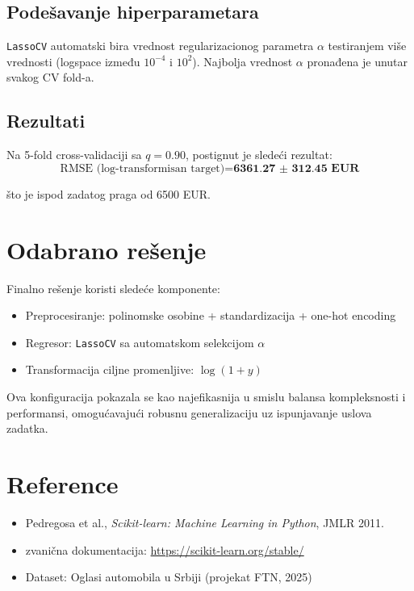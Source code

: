 \documentclass[a4paper,12pt]{article}
\begin{document}
\subsection{Podešavanje hiperparametara}

\texttt{LassoCV} automatski bira vrednost regularizacionog parametra $\alpha$ testiranjem više vrednosti (logspace između $10^{-4}$ i $10^2$). Najbolja vrednost $\alpha$ pronađena je unutar svakog CV fold-a.

\subsection{Rezultati}

Na 5-fold cross-validaciji sa $q=0.90$, postignut je sledeći rezultat:
\[
\text{RMSE (log-transformisan target)} = \textbf{6361.27 ± 312.45 EUR}
\]

što je ispod zadatog praga od 6500 EUR.

\section{Odabrano rešenje}

Finalno rešenje koristi sledeće komponente:
\begin{itemize}
    \item Preprocesiranje: polinomske osobine + standardizacija + one-hot encoding
    \item Regresor: \texttt{LassoCV} sa automatskom selekcijom $\alpha$
    \item Transformacija ciljne promenljive: $\log(1 + y)$
\end{itemize}

Ova konfiguracija pokazala se kao najefikasnija u smislu balansa kompleksnosti i performansi, omogućavajući robusnu generalizaciju uz ispunjavanje uslova zadatka.

\section*{Reference}

\begin{itemize}
    \item Pedregosa et al., \textit{Scikit-learn: Machine Learning in Python}, JMLR 2011.
    \item zvanična dokumentacija: \url{https://scikit-learn.org/stable/}
    \item Dataset: Oglasi automobila u Srbiji (projekat FTN, 2025)
\end{itemize}
\end{document}
